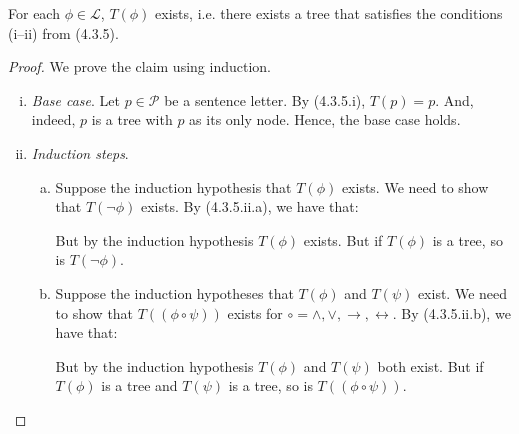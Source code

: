 \begin{enumerate}[\thesection.1]
		\begin{lemma}
		For each $\phi\in\mathcal{L}$, $T(\phi)$ exists, i.e. there exists a tree that satisfies the conditions (i--ii) from (4.3.5).
		\end{lemma}
		\begin{proof}
		We prove the claim using induction.
		
			\begin{enumerate}[(i)]
			
				\item \emph{Base case}. Let $p\in\mathcal{P}$ be a sentence letter. By (4.3.5.i), $T(p)=p$. And, indeed, $p$ is a tree with $p$ as its only node. Hence, the base case holds.
				
				\item \emph{Induction steps}.
				
					\begin{enumerate}[(a)]
					
						\item Suppose the induction hypothesis that $T(\phi)$ exists. We need to show that $T(\neg \phi)$ exists. By (4.3.5.ii.a), we have that: 
						
						\begin{center}
\end{center}
But by the induction hypothesis $T(\phi)$ exists. But if $T(\phi)$ is a tree, so is $T(\neg\phi)$.

				\item Suppose the induction hypotheses that $T(\phi)$ and $T(\psi)$ exist. We need to show that $T((\phi\circ\psi))$ exists for $\circ=\land,\lor,\to,\leftrightarrow$. By (4.3.5.ii.b), we have that: 
						
						\begin{center}
\end{center}
But by the induction hypothesis $T(\phi)$ and $T(\psi)$ both exist. But if $T(\phi)$ is a tree and $T(\psi)$ is a tree, so is $T((\phi\circ\psi))$.					
					\end{enumerate}
			

\end{enumerate}
\end{proof}
\end{enumerate}
